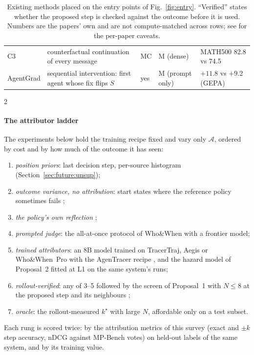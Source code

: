 \begin{table}[h]
\begin{tabularx}{\linewidth}{@{}l >{\RaggedRight\hsize=1.05\hsize}X l >{\RaggedRight\hsize=0.95\hsize}X l@{}}
C3 \cite{chen2026c3} & counterfactual continuation of every message & MC & M (dense) & MATH500 82.8 vs 74.5 \\
AgentGrad \cite{chu2026agentgrad} & sequential intervention: first agent whose fix flips $S$ & yes & M (prompt only) & $+11.8$ vs $+9.2$ (GEPA) \\\bottomrule
\end{tabularx}
\caption{Existing methods placed on the entry points of Fig.~\ref{fig:entry}. ``Verified'' states whether the proposed step is checked against the outcome before it is used. Numbers are the papers' own and are not compute-matched across rows; see  for the per-paper caveats.}
\label{tab:entry}
\end{table}

\begin{multicols}{2}
\paragraph{The attributor ladder} The experiments below hold the training recipe fixed and vary only $\mathcal{A}$, ordered by cost and by how much of the outcome it has seen:
\begin{enumerate}[leftmargin=1.4em,itemsep=1pt]
\item \emph{position priors}: last decision step, per-source histogram (Section~\ref{sec:future:unsup});
\item \emph{outcome variance, no attribution}: start states where the reference policy sometimes fails \cite{pivotrl2026};
\item \emph{the policy's own reflection} \cite{guo2026pivoarl};
\item \emph{prompted judge}: the all-at-once protocol of Who\&When with a frontier model;
\item \emph{trained attributors}: an 8B model trained on TracerTraj, Aegis or Who\&When~Pro with the AgenTracer recipe \cite{agentracer2026}, and the hazard model of Proposal~2 fitted at L1 on the same system's runs;
\item \emph{rollout-verified}: any of 3--5 followed by the screen of Proposal~1 with $N\le8$ at the proposed step and its neighbours \cite{liang2026elpo,jung2026prover};
\item \emph{oracle}: the rollout-measured $k^\star$ with large $N$, affordable only on a test subset.
\end{enumerate}
Each rung is scored twice: by the attribution metrics of this survey (exact and $\pm k$ step accuracy, nDCG against MP-Bench votes) on held-out labels of the same system, and by its training value.


\end{multicols}
